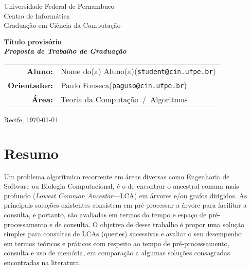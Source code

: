 \documentclass[12pt, a4paper, oneside]{article}
\makeatletter
\newcommand{\thetitle}{Título provisório}
\newcommand{\workarea}{Teoria da Computação~/~Algoritmos}
\newcommand{\major}{Ciência da Computação}
\newcommand{\studenttitle}{Aluno}
\newcommand{\student}{Nome do(a) Aluno(a)}
\newcommand{\studentemail}{student@cin.ufpe.br}
\newcommand{\advisertitle}{Orientador}
\newcommand{\adviser}{Paulo Fonseca}
\newcommand{\adviseremail}{paguso@cin.ufpe.br}
\makeatother
\begin{document}


\thispagestyle{empty}
\begin{center}
\Large
Universidade Federal de Pernambuco\\
Centro de Informática\\
Graduação em \major

\vfill

{\huge \bfseries \thetitle}
\\
\medskip
{\bfseries\itshape Proposta de Trabalho de Graduação}

\vfill

\bigskip

	\begin{tabular}{r p{95mm}}
	\textbf{\studenttitle: } & \student \newline(\texttt{\studentemail}) \\ 
\textbf{\advisertitle: } & \adviser \newline(\texttt{\adviseremail})
\\
	\textbf{Área: } & \workarea 
\end{tabular}

	\vspace{3cm}
Recife, \today 
{}
\end{center}

\clearpage 
\thispagestyle{empty}
\section*{Resumo}
Um problema algorítmico recorrente em áreas diversas como Engenharia de Software ou Biologia Computacional, é o de encontrar o ancestral comum mais profundo (\textit{Lowest Common Ancestor}---LCA) em árvores e/ou grafos dirigidos. As principais soluções existentes consistem em pré-processar a árvore para facilitar a consulta, e portanto, são avaliadas em termos do tempo e espaço de pré-processamento e de consulta. O objetivo de desse trabalho é propor uma solução simples para consultas de LCAs (queries) sucessivas e avaliar o seu desempenho em termos teóricos e práticos com respeito ao tempo de pré-processamento, consulta e uso de memória, em comparação a algumas soluções consagradas encontradas na literatura.

\clearpage
\setcounter{page}{1}
\end{document}

